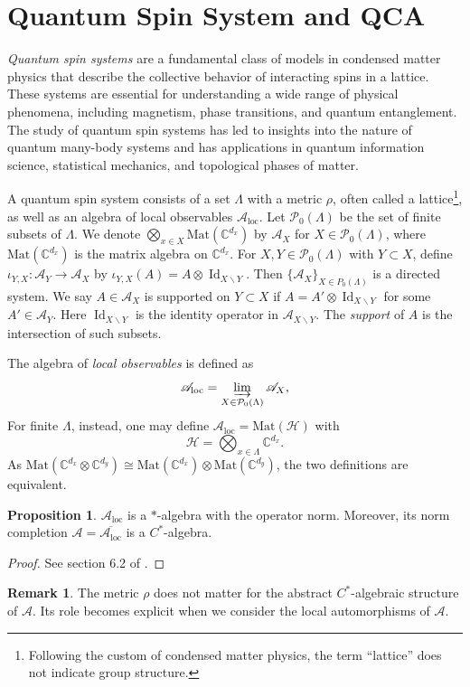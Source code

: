 \documentclass{article}
\theoremstyle{definition}
\newtheorem{rmk}[theorem]{Remark}
\newtheorem{prop}[theorem]{Proposition}
\DeclareMathOperator{\Id}{Id}
\newcommand{\CC}{{\mathbb C}}
\newcommand{\SA}{{\mathscr A}}
\begin{document}
\section{Quantum Spin System and QCA}
\textit{Quantum spin systems} are a fundamental class of models in condensed matter physics that describe the collective behavior of interacting spins in a lattice. These systems are essential for understanding a wide range of physical phenomena, including magnetism, phase transitions, and quantum entanglement. The study of quantum spin systems has led to insights into the nature of quantum many-body systems and has applications in quantum information science, statistical mechanics, and topological phases of matter. 

A quantum spin system consists of a set $\Lambda$ with a metric $\rho$, often called a lattice\footnote{Following the custom of condensed matter physics, the term ``lattice'' does not indicate group structure.}, as well as an algebra of local observables $\SA_{\mathrm {loc}}$.  Let $\mathcal P_0(\Lambda)$ be the set of finite subsets of $\Lambda.$  We denote $\bigotimes_{x\in X}\mathrm{Mat}(\CC^{d_x})$ by $\SA_X$ for $X\in \mathcal{P}_0(\Lambda)$, where $\mathrm{Mat}(\CC^{d_x})$ is the matrix algebra on $\CC^{d_x}$. For $X, Y \in \mathcal{P}_0(\Lambda)$ with $Y\subset X$, define $\iota_{Y,X}: \SA_Y\rightarrow \SA_X$ by $\iota_{Y,X}(A)= A\otimes \Id_{X\backslash Y}$. Then $\{\SA_X\}_{X\in P_0(\Lambda)}$ is a directed system. We say $A\in \SA_X$ is supported on $Y \subset X$ if $A=A'\otimes \Id_{X\backslash Y}$ for some $A'\in \SA_Y$. Here $\Id_{X\backslash Y}$ is the identity operator in $\SA_{X\backslash Y}.$ The \textit{support} of $A$ is the intersection of such subsets. 

The algebra of \textit{local observables} is defined as
\begin{equation}
    \SA_{\mathrm {loc}}= \varinjlim_{X\in \mathcal P_0(\Lambda)}\SA_X,
\end{equation}
  For finite $\Lambda$, instead, one may define $\SA_{\mathrm {loc}}=\mathrm{Mat}(\mathcal H)$ with 
$$\mathcal{H}=\bigotimes_{x\in \Lambda} \CC^{d_x}.$$ As $\mathrm{Mat}(\CC^{d_x}\otimes \CC^{d_y})\cong \mathrm{Mat}(\CC^{d_x})\otimes\mathrm{Mat}(\CC^{d_y})$, the two definitions are equivalent. 
\begin{prop}
    $\SA_{\mathrm {loc}}$ is a $*$-algebra with the operator norm. Moreover, its norm completion $\SA=\overline{\SA_{\mathrm {loc}}}$ is a $C^*$-algebra. 
\end{prop}
\begin{proof}
See section 6.2 of \cite{bratteli2012operator}.    
\end{proof}
\begin{rmk}
The metric $\rho$ does not matter for the abstract $C^*$-algebraic structure of $\SA$. Its role becomes explicit when we consider the local automorphisms of $\SA$.  
\end{rmk}
\end{document}
